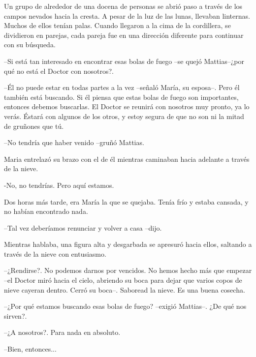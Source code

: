 Un grupo de alrededor de una docena de personas se abrió paso a través de los campos nevados hacia la cresta. A pesar de la luz de las lunas, llevaban linternas. Muchos de ellos tenían palas. Cuando llegaron a la cima de la cordillera, se dividieron en parejas, cada pareja fue  en una dirección diferente para continuar con su búsqueda.



--Si está tan interesado en encontrar esas bolas de fuego --se quejó Mattias--¿por qué no está el Doctor con nosotros?.


--Él no puede estar en todas partes a la vez --señaló María, su esposa--. Pero él también está buscando. Si él piensa que estas bolas de fuego son importantes, entonces debemos buscarlas. El Doctor se reunirá con nosotros muy pronto, ya lo verás. Éstará con algunos de los otros, y estoy segura de que no son ni la mitad de gruñones que tú.



--No tendría que haber venido --gruñó Mattias.



Maria entrelazó su brazo con el de él mientras caminaban hacia adelante a través de la nieve. 


-No, no tendrías. Pero aquí estamos.



Dos horas más tarde, era María la que se quejaba. Tenía frío y estaba cansada, y no habían encontrado nada. 


--Tal vez deberíamos renunciar y volver a casa --dijo.



Mientras hablaba, una figura alta y desgarbada se apresuró hacia ellos, saltando a través de la nieve con entusiasmo.



--¿Rendirse?. No podemos darnos por vencidos. No hemos hecho más que empezar --el Doctor miró hacia el cielo, abriendo su boca para dejar que varios copos de nieve cayeran dentro. Cerró su boca--. Saboread la nieve. Es una buena cosecha.



--¿Por qué estamos buscando esas bolas de fuego? --exigió Mattias--. ¿De qué nos sirven?.



--¿A nosotros?. Para nada en absoluto.



--Bien, entonces...



